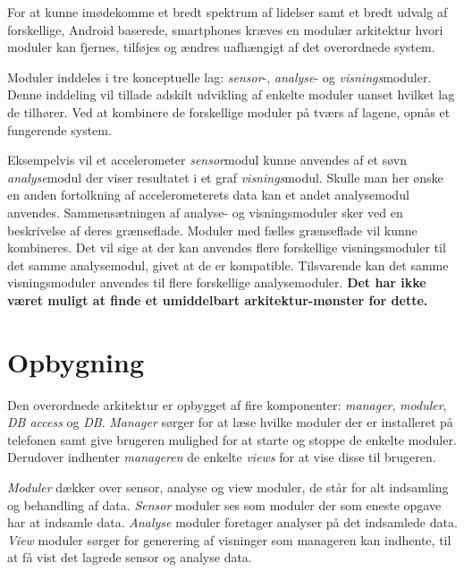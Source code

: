 For at kunne imødekomme et bredt spektrum af lidelser samt et bredt udvalg af forskellige, Android baserede, smartphones kræves en modulær arkitektur hvori moduler kan fjernes, tilføjes og ændres uafhængigt af det overordnede system.

Moduler inddeles i tre konceptuelle lag: \textit{sensor}-, \textit{analyse}- og \textit{visnings}moduler.
Denne inddeling vil tillade adskilt udvikling af enkelte moduler uanset hvilket lag de tilhører.
Ved at kombinere de forskellige moduler på tværs af lagene, opnås et fungerende system.

Eksempelvis vil et accelerometer \textit{sensor}modul kunne anvendes af et søvn \textit{analyse}modul der viser resultatet i et graf \textit{visnings}modul.
Skulle man her ønske en anden fortolkning af accelerometerets data kan et andet analysemodul anvendes.
Sammensætningen af analyse- og visningsmoduler sker ved en beskrivelse af deres grænseflade.
Moduler med fælles grænseflade vil kunne kombineres.
Det vil sige at der kan anvendes flere forskellige visningsmoduler til det samme analysemodul, givet at de er kompatible.
Tilsvarende kan det samme visningsmoduler anvendes til flere forskellige analysemoduler.
\textbf{Det har ikke været muligt at finde et umiddelbart arkitektur-mønster for dette.}

\section*{Opbygning}
Den overordnede arkitektur er opbygget af fire komponenter: \textit{manager}, \textit{moduler}, \textit{DB access} og \textit{DB}.
\textit{Manager} sørger for at læse hvilke moduler der er installeret på telefonen samt give brugeren mulighed for at starte og stoppe de enkelte moduler.
Derudover indhenter \textit{manageren} de enkelte \textit{views} for at vise disse til brugeren.

\textit{Moduler} dækker over sensor, analyse og view moduler, de står for alt indsamling og behandling af data.
\textit{Sensor} moduler ses som moduler der som eneste opgave har at indsamle data.
\textit{Analyse} moduler foretager analyser på det indsamlede data.
\textit{View} moduler sørger for generering af visninger som manageren kan indhente, til at få vist det lagrede sensor og analyse data.

